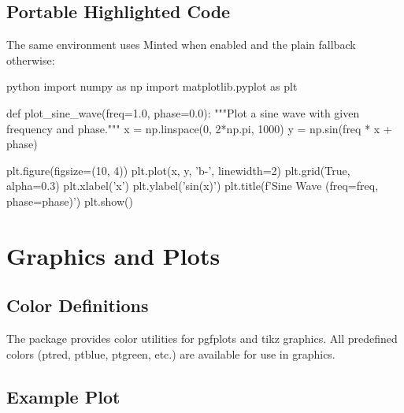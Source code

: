 \documentclass[11pt,letterpaper]{article}
\begin{document}
\subsection{Portable Highlighted Code}

The same environment uses Minted when enabled and the plain fallback otherwise:

\begin{ptprintcode}{python}
import numpy as np
import matplotlib.pyplot as plt

def plot_sine_wave(freq=1.0, phase=0.0):
    """Plot a sine wave with given frequency and phase."""
    x = np.linspace(0, 2*np.pi, 1000)
    y = np.sin(freq * x + phase)
    
    plt.figure(figsize=(10, 4))
    plt.plot(x, y, 'b-', linewidth=2)
    plt.grid(True, alpha=0.3)
    plt.xlabel('x')
    plt.ylabel('sin(x)')
    plt.title(f'Sine Wave (freq={freq}, phase={phase})')
    plt.show()
\end{ptprintcode}

\section{Graphics and Plots}

\subsection{Color Definitions}

The package provides color utilities for pgfplots and tikz graphics. All predefined colors (ptred, ptblue, ptgreen, etc.) are available for use in graphics.

\subsection{Example Plot}

\begin{center}
\end{center}
\end{document}
